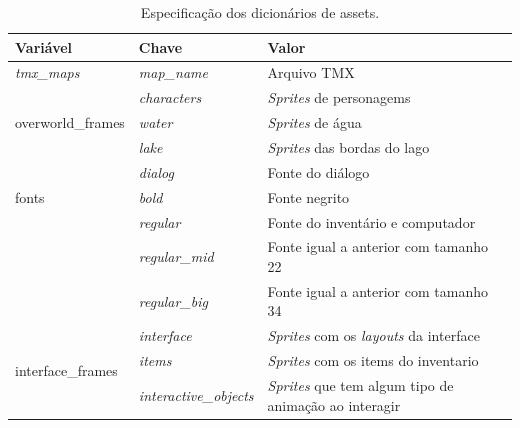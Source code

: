 \begin{table}[h!]
	\caption{Especificação dos dicionários de assets.}
	\label{tbl-especificacao-dicionario}
	\centering
	\renewcommand{\arraystretch}{2}
	\begin{small}
		\begin{tabular}{ | p{35mm} | p{35mm} | p{65mm} |}\hline \rowcolor{MidnightBlue}
                \hline
                Variável & Chave & Valor \\
                \hline
                \textit{tmx\_maps} & \textit{map\_name} & Arquivo TMX \\ 
                \hline
                \multirow{3}{4em}{overworld\_frames} 
                & \textit{characters} & \textit{Sprites} de personagems \\ 
                & \textit{water} & \textit{Sprites} de água \\ 
                & \textit{lake} & \textit{Sprites} das bordas do lago \\ 
                \hline
                \multirow{3}{4em}{fonts} 
                & \textit{dialog} & Fonte do diálogo \\ 
                & \textit{bold} & Fonte negrito \\ 
                & \textit{regular} & Fonte do inventário e computador \\ 
                & \textit{regular\_mid} & Fonte igual a anterior com tamanho 22 \\ 
                & \textit{regular\_big} & Fonte igual a anterior com tamanho 34 \\ 
                \hline
                \multirow{3}{4em}{interface\_frames} 
                & \textit{interface} & \textit{Sprites} com os \textit{layouts} da interface \\ 
                & \textit{items} & \textit{Sprites} com os items do inventario \\ 
                & \textit{interactive\_objects} & \textit{Sprites} que tem algum tipo de animação ao interagir \\ 
                \hline

                \end{tabular}
	\end{small}
\end{table}

